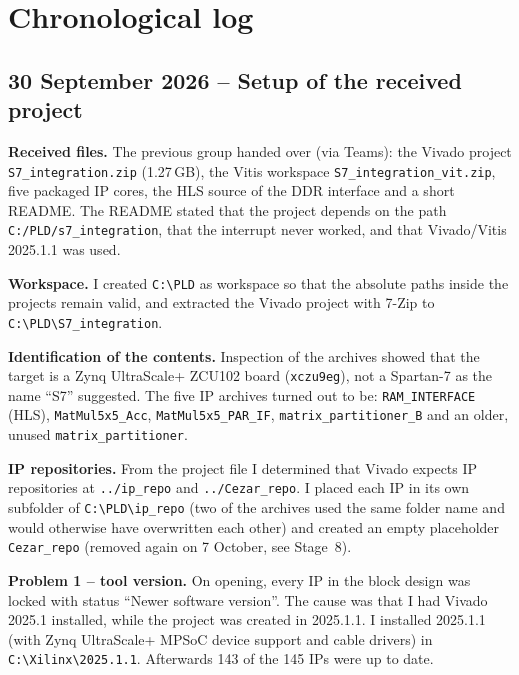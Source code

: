 \documentclass[11pt,a4paper]{article}
\newcommand{\code}[1]{\texttt{#1}}
\begin{document}
\section{Chronological log}

\subsection{30 September 2026 -- Setup of the received project}
\textbf{Received files.} The previous group handed over (via Teams): the Vivado project \code{S7\_integration.zip} (1.27\,GB), the Vitis workspace \code{S7\_integration\_vit.zip}, five packaged IP cores, the HLS source of the DDR interface and a short README. The README stated that the project depends on the path \code{C:/PLD/s7\_integration}, that the interrupt never worked, and that Vivado/Vitis 2025.1.1 was used.

\textbf{Workspace.} I created \code{C:\textbackslash PLD} as workspace so that the absolute paths inside the projects remain valid, and extracted the Vivado project with 7-Zip to \code{C:\textbackslash PLD\textbackslash S7\_integration}.

\textbf{Identification of the contents.} Inspection of the archives showed that the target is a Zynq UltraScale+ ZCU102 board (\code{xczu9eg}), not a Spartan-7 as the name ``S7'' suggested. The five IP archives turned out to be: \code{RAM\_INTERFACE} (HLS), \code{MatMul5x5\_Acc}, \code{MatMul5x5\_PAR\_IF}, \code{matrix\_partitioner\_B} and an older, unused \code{matrix\_partitioner}.

\textbf{IP repositories.} From the project file I determined that Vivado expects IP repositories at \code{../ip\_repo} and \code{../Cezar\_repo}. I placed each IP in its own subfolder of \code{C:\textbackslash PLD\textbackslash ip\_repo} (two of the archives used the same folder name and would otherwise have overwritten each other) and created an empty placeholder \code{Cezar\_repo} (removed again on 7 October, see Stage~8).

\textbf{Problem 1 -- tool version.} On opening, every IP in the block design was locked with status ``Newer software version''. The cause was that I had Vivado 2025.1 installed, while the project was created in 2025.1.1. I installed 2025.1.1 (with Zynq UltraScale+ MPSoC device support and cable drivers) in \code{C:\textbackslash Xilinx\textbackslash 2025.1.1}. Afterwards 143 of the 145 IPs were up to date.
\end{document}
